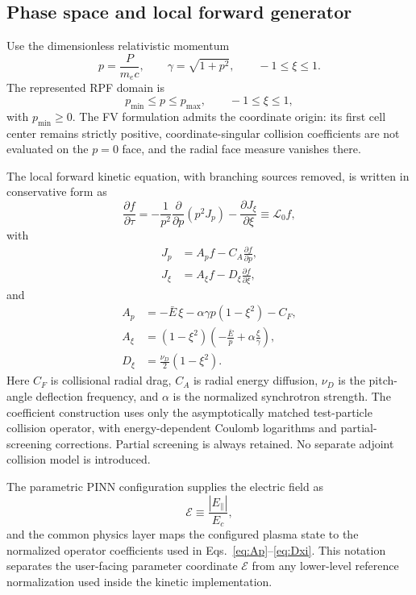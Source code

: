\documentclass[11pt]{article}
\newcommand{\Ecfg}{\mathcal E}
\begin{document}
\subsection{Phase space and local forward generator}

Use the dimensionless relativistic momentum
\begin{equation}
 p=\frac{P}{m_ec},\qquad \gamma=\sqrt{1+p^2},\qquad -1\le\xi\le1.
\end{equation}
The represented RPF domain is
\begin{equation}
p_{\min}\le p\le p_{\max},\qquad -1\le\xi\le1,
\end{equation}
with $p_{\min}\ge0$.  The FV formulation admits the coordinate origin: its
first cell center remains strictly positive, coordinate-singular collision
coefficients are not evaluated on the $p=0$ face, and the radial face measure
vanishes there.

The local forward kinetic equation, with branching sources removed, is written in
conservative form as
\begin{equation}
 \frac{\partial f}{\partial\tau}
 =-\frac{1}{p^2}\frac{\partial}{\partial p}\left(p^2J_p\right)
  -\frac{\partial J_\xi}{\partial\xi}
 \equiv \mathcal L_0 f,
 \label{eq:forward_local}
\end{equation}
with
\begin{align}
 J_p&=A_p f-C_A\frac{\partial f}{\partial p},\\
 J_\xi&=A_\xi f-D_\xi\frac{\partial f}{\partial\xi},
\end{align}
and
\begin{align}
 A_p
 &=-\bar E\,\xi-\alpha\gamma p(1-\xi^2)-C_F,
 \label{eq:Ap}\\
 A_\xi
 &=(1-\xi^2)\left(-\frac{\bar E}{p}+\alpha\frac{\xi}{\gamma}\right),
 \label{eq:Axi}\\
 D_\xi
 &=\frac{\nu_D}{2}(1-\xi^2).
 \label{eq:Dxi}
\end{align}
Here $C_F$ is collisional radial drag, $C_A$ is radial energy diffusion, $\nu_D$ is the
pitch-angle deflection frequency, and $\alpha$ is the normalized synchrotron strength.
The coefficient construction uses only the asymptotically matched test-particle collision
operator, with energy-dependent Coulomb logarithms and partial-screening corrections.
Partial screening is always retained.
No separate adjoint collision model is introduced.

The parametric PINN configuration supplies the electric field as
\begin{equation}
 \Ecfg\equiv \frac{|E_\parallel|}{E_c},
\end{equation}
and the common physics layer maps the configured plasma state to the normalized operator
coefficients used in Eqs.~\eqref{eq:Ap}--\eqref{eq:Dxi}.  This notation separates the
user-facing parameter coordinate $\Ecfg$ from any lower-level reference normalization used
inside the kinetic implementation.
\end{document}
